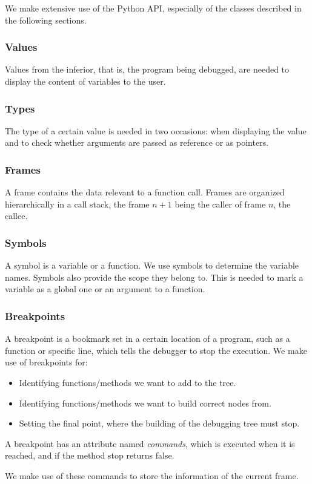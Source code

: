 We make extensive use of the Python API, especially of the classes described in the following sections.

\subsubsection{Values}
Values from the inferior, that is, the program being debugged, are needed to display the content of variables to the user.
\subsubsection{Types}
The type of a certain value is needed in two occasions: when displaying the value and to check whether arguments are passed as reference or as pointers.
\subsubsection{Frames}
A frame contains the data relevant to a function call.
Frames are organized hierarchically in a call stack, the frame \(n+1\) being the caller of frame \(n\), the callee.
\subsubsection{Symbols}
A symbol is a variable or a function. We use symbols to determine the variable names. Symbols also provide the scope they belong to. This is needed to mark a variable as a global one or an argument to a function. 
\subsubsection{Breakpoints}
A breakpoint is a bookmark set in a certain location of a program, such as a function or specific line, which tells the debugger to stop the execution.
We make use of breakpoints for:
\begin{itemize}
    \item Identifying functions/methods we want to add to the tree.
    \item Identifying functions/methods we want to build correct nodes from.
    \item Setting the final point, where the building of the debugging tree must stop.
\end{itemize}
A breakpoint has an attribute named \emph{commands}, which is executed when it is reached, and if the method stop returns false.

We make use of these commands to store the information of the current frame.
